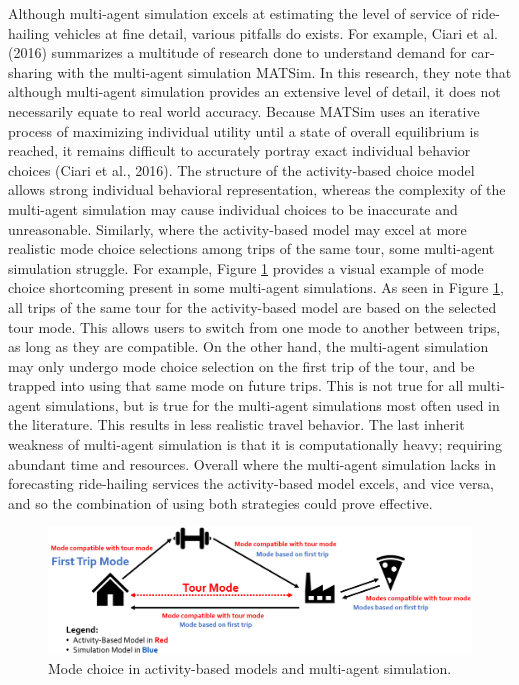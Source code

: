 \documentclass[simple, masters, twoside]{byuthesis}
\begin{document}
Although multi-agent simulation excels at estimating the level of service of ride-hailing vehicles at fine detail, various pitfalls do exists. For example, Ciari et al. (2016) summarizes a multitude of research done to understand demand for car-sharing with the multi-agent simulation MATSim. In this research, they note that although multi-agent simulation provides an extensive level of detail, it does not necessarily equate to real world accuracy. Because MATSim uses an iterative process of maximizing individual utility until a state of overall equilibrium is reached, it remains difficult to accurately portray exact individual behavior choices (Ciari et al., 2016). The structure of the activity-based choice model allows strong individual behavioral representation, whereas the complexity of the multi-agent simulation may cause individual choices to be inaccurate and unreasonable. Similarly, where the activity-based model may excel at more realistic mode choice selections among trips of the same tour, some multi-agent simulation struggle. For example, Figure \ref{fig:fig-mode-compare} provides a visual example of mode choice shortcoming present in some multi-agent simulations. As seen in Figure \ref{fig:fig-mode-compare}, all trips of the same tour for the activity-based model are based on the selected tour mode. This allows users to switch from one mode to another between trips, as long as they are compatible. On the other hand, the multi-agent simulation may only undergo mode choice selection on the first trip of the tour, and be trapped into using that same mode on future trips. This is not true for all multi-agent simulations, but is true for the multi-agent simulations most often used in the literature. This results in less realistic travel behavior. The last inherit weakness of multi-agent simulation is that it is computationally heavy; requiring abundant time and resources. Overall where the multi-agent simulation lacks in forecasting ride-hailing services the activity-based model excels, and vice versa, and so the combination of using both strategies could prove effective.

\begin{figure}

{\centering \includegraphics[width=1\linewidth,]{pics/abm-mas-compare} 

}

\caption[Activity-based models vs. multi-agent simulation.]{Mode choice in activity-based models and multi-agent simulation.}\label{fig:fig-mode-compare}
\end{figure}
\end{document}

